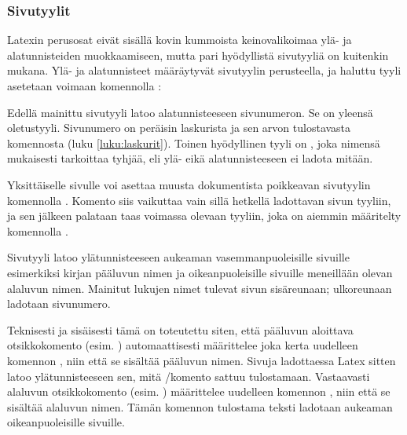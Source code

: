 \subsubsection{Sivutyylit}

Latexin perusosat eivät sisällä kovin kummoista keinovalikoimaa ylä- ja
alatunnisteiden muokkaamiseen, mutta pari hyödyllistä sivutyyliä on
kuitenkin mukana. Ylä- ja alatunnisteet määräytyvät sivutyylin
perusteella, ja haluttu tyyli asetetaan voimaan komennolla
:

\begin{koodilohkosis}
\pagestyle{plain}
\end{koodilohkosis}

Edellä mainittu sivutyyli  latoo alatunnisteeseen
sivunumeron. Se on yleensä oletustyyli. Sivunumero on peräisin
laskurista  ja sen arvon tulostavasta komennosta
 (luku \ref{luku:laskurit}). Toinen hyödyllinen tyyli
on , joka nimensä mukaisesti tarkoittaa tyhjää, eli ylä-
eikä alatunnisteeseen ei ladota mitään.

Yksittäiselle sivulle voi asettaa muusta dokumentista poikkeavan
sivutyylin komennolla . Komento siis vaikuttaa
vain sillä hetkellä ladottavan sivun tyyliin, ja sen jälkeen palataan
taas voimassa olevaan tyyliin, joka on aiemmin määritelty komennolla
.

\begin{koodilohkosis}
\thispagestyle{empty}
\end{koodilohkosis}

Sivutyyli  latoo ylätunnisteeseen aukeaman
vasemmanpuoleisille sivuille esimerkiksi kirjan pääluvun nimen ja
oikeanpuoleisille sivuille meneillään olevan alaluvun nimen. Mainitut
lukujen nimet tulevat sivun sisäreunaan; ulkoreunaan ladotaan
sivunumero.

Teknisesti ja sisäisesti tämä on toteutettu siten, että pääluvun
aloittava otsikkokomento (esim. ) automaattisesti
määrittelee joka kerta uudelleen komennon , niin että
se sisältää pääluvun nimen. Sivuja ladottaessa Latex sitten latoo
ylätunnisteeseen sen, mitä \-/komento sattuu
tulostamaan. Vastaavasti alaluvun otsikkokomento (esim.
) määrittelee uudelleen komennon ,
niin että se sisältää alaluvun nimen. Tämän komennon tulostama teksti
ladotaan aukeaman oikeanpuoleisille sivuille.

